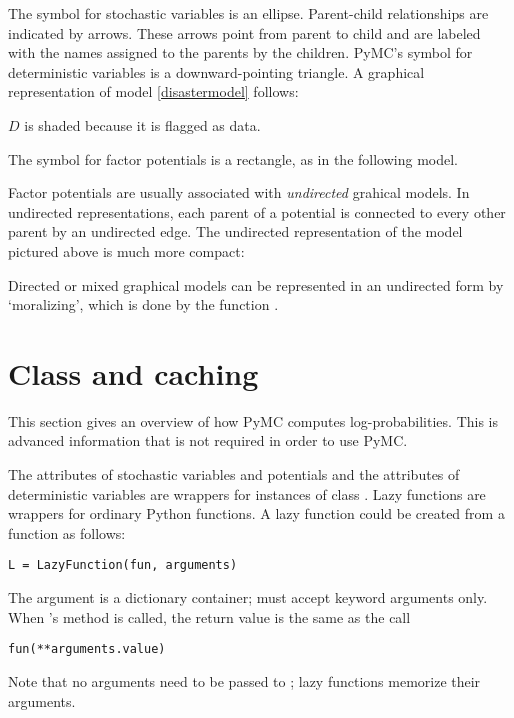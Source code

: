 The symbol for stochastic variables is an ellipse. Parent-child relationships are indicated by arrows. These arrows point from parent to child and are labeled with the names assigned to the parents by the children. PyMC's symbol for deterministic variables is a downward-pointing triangle. A graphical representation of model \ref{disastermodel} follows:
\begin{center}
\end{center}
$D$ is shaded because it is flagged as data.


The symbol for factor potentials is a rectangle, as in the following model.
\begin{center}
\end{center}
Factor potentials are usually associated with \emph{undirected} grahical models. In undirected representations, each parent of a potential is connected to every other parent by an undirected edge. The undirected representation of the model pictured above is much more compact:
\begin{center}
\end{center}
Directed or mixed graphical models can be represented in an undirected form by `moralizing', which is done by the function .


\section[Class LazyFunction and caching]{Class 
and caching}
\label{sec:caching} 
This section gives an overview of how PyMC computes log-probabilities. This is advanced information that is not required in order to use PyMC.

The  attributes of stochastic variables and potentials and the  attributes of deterministic variables are wrappers for instances of class . Lazy functions are wrappers for ordinary Python functions. A lazy function  could be created from a function  as follows:
\begin{verbatim}
L = LazyFunction(fun, arguments)
\end{verbatim}
The argument  is a dictionary container;  must accept keyword arguments only. When 's  method is called, the return value is the same as the call 
\begin{verbatim}
fun(**arguments.value)
\end{verbatim}
Note that no arguments need to be passed to ; lazy functions memorize their arguments.

